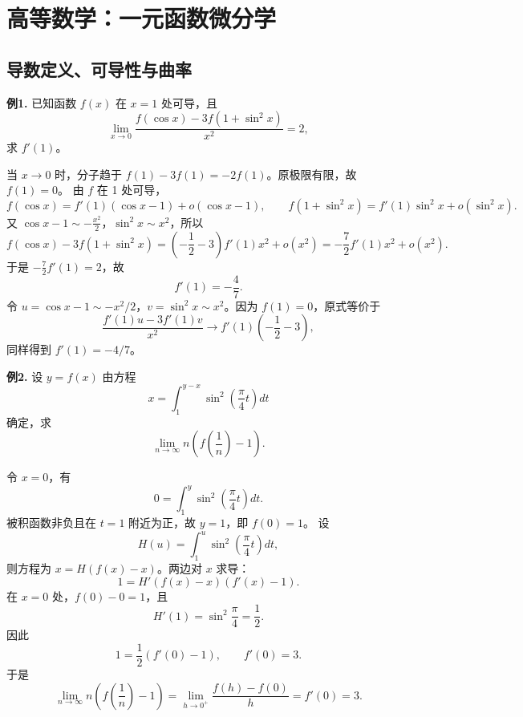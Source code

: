 \chapter{高等数学：一元函数微分学}

\section{导数定义、可导性与曲率}

\begin{problemblock}
\textbf{例1.} 已知函数 \(f(x)\) 在 \(x=1\) 处可导，且
\[
\lim_{x\to0}\frac{f(\cos x)-3f(1+\sin^2x)}{x^2}=2,
\]
求 \(f'(1)\)。
\end{problemblock}
\begin{solutionblock}
当 \(x\to0\) 时，分子趋于 \(f(1)-3f(1)=-2f(1)\)。原极限有限，故 \(f(1)=0\)。
由 \(f\) 在 1 处可导，
\[
f(\cos x)=f'(1)(\cos x-1)+o(\cos x-1),\qquad
f(1+\sin^2x)=f'(1)\sin^2x+o(\sin^2x).
\]
又 \(\cos x-1\sim-\frac{x^2}{2}\)，\(\sin^2x\sim x^2\)，所以
\[
f(\cos x)-3f(1+\sin^2x)
=\left(-\frac12-3\right)f'(1)x^2+o(x^2)
=-\frac72f'(1)x^2+o(x^2).
\]
于是 \(-\frac72f'(1)=2\)，故
\[
f'(1)=-\frac47.
\]
令 \(u=\cos x-1\sim-x^2/2\)，\(v=\sin^2x\sim x^2\)。因为 \(f(1)=0\)，原式等价于
\[
\frac{f'(1)u-3f'(1)v}{x^2}\to f'(1)\left(-\frac12-3\right),
\]
同样得到 \(f'(1)=-4/7\)。
\end{solutionblock}

\begin{problemblock}
\textbf{例2.} 设 \(y=f(x)\) 由方程
\[
x=\int_1^{y-x}\sin^2\left(\frac{\pi}{4}t\right)dt
\]
确定，求
\[
\lim_{n\to\infty}n\left(f\left(\frac1n\right)-1\right).
\]
\end{problemblock}
\begin{solutionblock}
令 \(x=0\)，有
\[
0=\int_1^{y} \sin^2\left(\frac{\pi}{4}t\right)dt.
\]
被积函数非负且在 \(t=1\) 附近为正，故 \(y=1\)，即 \(f(0)=1\)。
设
\[
H(u)=\int_1^u\sin^2\left(\frac{\pi}{4}t\right)dt,
\]
则方程为 \(x=H(f(x)-x)\)。两边对 \(x\) 求导：
\[
1=H'(f(x)-x)(f'(x)-1).
\]
在 \(x=0\) 处，\(f(0)-0=1\)，且
\[
H'(1)=\sin^2\frac\pi4=\frac12.
\]
因此
\[
1=\frac12(f'(0)-1),\qquad f'(0)=3.
\]
于是
\[
\lim_{n\to\infty}n\left(f\left(\frac1n\right)-1\right)
=\lim_{h\to0^+}\frac{f(h)-f(0)}h=f'(0)=3.
\]
\end{solutionblock}

